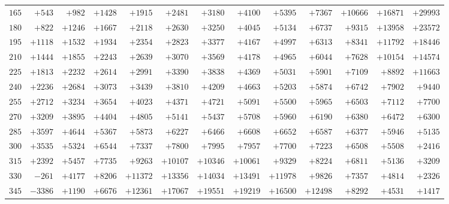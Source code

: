 \begin{landscape}
\begin{center}
\begin{tabular}{@{}r|*{11}{r|}r@{}}
\(165\) & \(+543\) & \(+982\) & \(+1428\) & \(+1915\) & \(+2481\) & \(+3180\) & \(+4100\) & \(+5395\) & \(+7367\) & \(+10666\) & \(+16871\) & \(+29993\)\\
\(180\) & \(+822\) & \(+1246\) & \(+1667\) & \(+2118\) & \(+2630\) & \(+3250\) & \(+4045\) & \(+5134\) & \(+6737\) & \(+9315\) & \(+13958\) & \(+23572\)\\
\(195\) & \(+1118\) & \(+1532\) & \(+1934\) & \(+2354\) & \(+2823\) & \(+3377\) & \(+4167\) & \(+4997\) & \(+6313\) & \(+8341\) & \(+11792\) & \(+18446\)\\
\(210\) & \(+1444\) & \(+1855\) & \(+2243\) & \(+2639\) & \(+3070\) & \(+3569\) & \(+4178\) & \(+4965\) & \(+6044\) & \(+7628\) & \(+10154\) & \(+14574\)\\
\(225\) & \(+1813\) & \(+2232\) & \(+2614\) & \(+2991\) & \(+3390\) & \(+3838\) & \(+4369\) & \(+5031\) & \(+5901\) & \(+7109\) & \(+8892\) & \(+11663\)\\
\(240\) & \(+2236\) & \(+2684\) & \(+3073\) & \(+3439\) & \(+3810\) & \(+4209\) & \(+4663\) & \(+5203\) & \(+5874\) & \(+6742\) & \(+7902\) & \(+9440\)\\
\(255\) & \(+2712\) & \(+3234\) & \(+3654\) & \(+4023\) & \(+4371\) & \(+4721\) & \(+5091\) & \(+5500\) & \(+5965\) & \(+6503\) & \(+7112\) & \(+7700\)\\
\(270\) & \(+3209\) & \(+3895\) & \(+4404\) & \(+4805\) & \(+5141\) & \(+5437\) & \(+5708\) & \(+5960\) & \(+6190\) & \(+6380\) & \(+6472\) & \(+6300\)\\
\(285\) & \(+3597\) & \(+4644\) & \(+5367\) & \(+5873\) & \(+6227\) & \(+6466\) & \(+6608\) & \(+6652\) & \(+6587\) & \(+6377\) & \(+5946\) & \(+5135\)\\
\(300\) & \(+3535\) & \(+5324\) & \(+6544\) & \(+7337\) & \(+7800\) & \(+7995\) & \(+7957\) & \(+7700\) & \(+7223\) & \(+6508\) & \(+5508\) & \(+2416\)\\
\(315\) & \(+2392\) & \(+5457\) & \(+7735\) & \(+9263\) & \(+10107\) & \(+10346\) & \(+10061\) & \(+9329\) & \(+8224\) & \(+6811\) & \(+5136\) & \(+3209\)\\
\(330\) & \(-261\) & \(+4177\) & \(+8206\) & \(+11372\) & \(+13356\) & \(+14034\) & \(+13491\) & \(+11978\) & \(+9826\) & \(+7357\) & \(+4814\) & \(+2326\)\\
\(345\) & \(-3386\) & \(+1190\) & \(+6676\) & \(+12361\) & \(+17067\) & \(+19551\) & \(+19219\) & \(+16500\) & \(+12498\) & \(+8292\) & \(+4531\) & \(+1417\)\\
\end{tabular}
\end{center}
\endgroup
\end{landscape}


